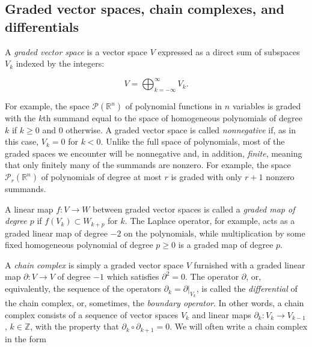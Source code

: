 \subsection{{Graded vector spaces, chain complexes, and differentials}}\label{sec:graded-chain-complexes}

{A \emph{graded vector space} is a vector space $V$ expressed as a direct sum of subspaces $V_k$ indexed by the integers:}

\[
V=\bigoplus_{k=-\infty}^{\infty}V_k.
\]

{For example, the space $\mathcal P(\mathbb R^n)$ of polynomial functions in $n$ variables is graded with the $k$th summand equal to the space of homogeneous polynomials of degree $k$ if $k\geq0$ and $0$ otherwise. A graded vector space is called \emph{nonnegative} if, as in this case, $V_k=0$ for $k<0$. Unlike the full space of polynomials, most of the graded spaces we encounter will be nonnegative and, in addition, \emph{finite}, meaning that only finitely many of the summands are nonzero. For example, the space $\mathcal P_r(\mathbb R^n)$ of polynomials of degree at most $r$ is graded with only $r+1$ nonzero summands.}

{A linear map $f:V\to W$ between graded vector spaces is called a \emph{graded map of degree $p$} if $f(V_k)\subset W_{k+p}$ for $k$. The Laplace operator, for example, acts as a graded linear map of degree $-2$ on the polynomials, while multiplication by some fixed homogeneous polynomial of degree $p\geq0$ is a graded map of degree $p$.}

{A \emph{chain complex} is simply a graded vector space $V$ furnished with a graded linear map $\partial:V\to V$ of degree $-1$ which satisfies $\partial^2=0$. The operator $\partial$, or, equivalently, the sequence of the operators $\partial_k=\partial|_{V_k}$, is called the \emph{differential} of the chain complex, or, sometimes, the \emph{boundary operator}. In other words, a chain complex consists of a sequence of vector spaces $V_k$ and linear maps $\partial_k:V_k\to V_{k-1}$, $k\in\mathbb Z$, with the property that $\partial_k\circ\partial_{k+1}=0$. We will often write a chain complex in the form}

